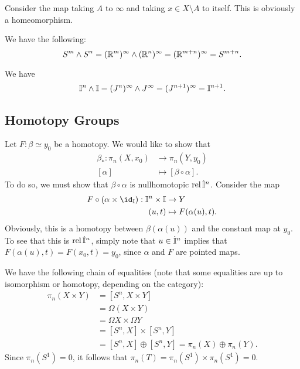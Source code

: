 \documentclass[../../solutions.tex]{subfiles}
\begin{document}
\begin{exercise} \leavevmode
Consider the map taking $A$ to $\infty$ and taking $x\in X\setminus A$ to itself.
This is obviously a homeomorphism.
\end{exercise}

\begin{exercise} \leavevmode
We have the following:
\[S^m\wedge S^n=(\mathbb{R}^m)^\infty\wedge(\mathbb{R}^n)^\infty=(\mathbb{R}^{m+n})^\infty=S^{m+n}.\]
\end{exercise}

\begin{exercise} \leavevmode
We have
\[\mathbb I^n\wedge\mathbb I=(J^n)^\infty\wedge J^\infty=(J^{n+1})^\infty=\mathbb I^{n+1}.\]
\end{exercise}

\subsection{Homotopy Groups}
\begin{exercise} \leavevmode
Let $F:\beta\simeq y_0$ be a homotopy.
We would like to show that
\begin{align*}
\beta_*:\pi_n(X,x_0)&\to\pi_n(Y,y_0)\\
[\alpha]&\mapsto[\beta\circ\alpha].
\end{align*}
To do so, we must show that $\beta\circ\alpha$ is nullhomotopic $\operatorname{rel}\dot{\mathbb I}^n$.
Consider the map
\begin{align*}
F\circ(\alpha\times\id_\II):\II^n\times\II&\to Y\\
(u,t)&\mapsto F(\alpha(u),t).
\end{align*}
Obviously, this is a homotopy between $\beta(\alpha(u))$ and the constant map at $y_0$.
To see that this is $\operatorname{rel}\dot{\mathbb I}^n$, simply note that $u\in\dot{\mathbb I}^n$ implies that $F(\alpha(u),t)=F(x_0,t)=y_0$, since $\alpha$ and $F$ are pointed maps.
\end{exercise}

\begin{exercise} \leavevmode
We have the following chain of equalities (note that some equalities are up to isomorphism or homotopy, depending on the category):
\begin{align*}
\pi_n(X\times Y)&=[S^n,X\times Y] \\
&=\Omega(X\times Y) \\
&=\Omega X\times\Omega Y \\
&=[S^n,X]\times[S^n,Y] \\
&=[S^n,X]\oplus[S^n,Y]=\pi_n(X)\oplus\pi_n(Y).
\end{align*}
Since $\pi_n(S^1)=0$, it follows that $\pi_n(T)=\pi_n(S^1)\times\pi_n(S^1)=0$.
\end{exercise}
\end{document}
